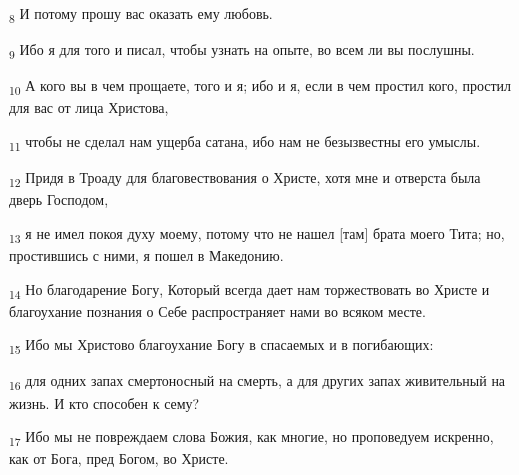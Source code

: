 \begin{tcolorbox}
\textsubscript{8} И потому прошу вас оказать ему любовь.
\end{tcolorbox}
\begin{tcolorbox}
\textsubscript{9} Ибо я для того и писал, чтобы узнать на опыте, во всем ли вы послушны.
\end{tcolorbox}
\begin{tcolorbox}
\textsubscript{10} А кого вы в чем прощаете, того и я; ибо и я, если в чем простил кого, простил для вас от лица Христова,
\end{tcolorbox}
\begin{tcolorbox}
\textsubscript{11} чтобы не сделал нам ущерба сатана, ибо нам не безызвестны его умыслы.
\end{tcolorbox}
\begin{tcolorbox}
\textsubscript{12} Придя в Троаду для благовествования о Христе, хотя мне и отверста была дверь Господом,
\end{tcolorbox}
\begin{tcolorbox}
\textsubscript{13} я не имел покоя духу моему, потому что не нашел [там] брата моего Тита; но, простившись с ними, я пошел в Македонию.
\end{tcolorbox}
\begin{tcolorbox}
\textsubscript{14} Но благодарение Богу, Который всегда дает нам торжествовать во Христе и благоухание познания о Себе распространяет нами во всяком месте.
\end{tcolorbox}
\begin{tcolorbox}
\textsubscript{15} Ибо мы Христово благоухание Богу в спасаемых и в погибающих:
\end{tcolorbox}
\begin{tcolorbox}
\textsubscript{16} для одних запах смертоносный на смерть, а для других запах живительный на жизнь. И кто способен к сему?
\end{tcolorbox}
\begin{tcolorbox}
\textsubscript{17} Ибо мы не повреждаем слова Божия, как многие, но проповедуем искренно, как от Бога, пред Богом, во Христе.
\end{tcolorbox}
